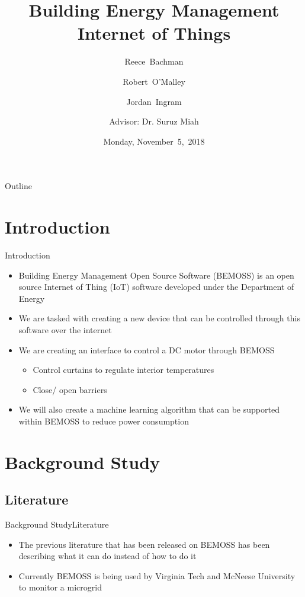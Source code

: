 \documentclass{beamer}
\title[BEMOSS]{Building Energy Management Internet of Things}
\author[R.~Bachman, R.~O'Malley, J.~Ingram]{Reece~Bachman \and Robert~O'Malley \and Jordan~Ingram \and
Advisor: Dr. Suruz Miah}
\date[November~5,~2018]{Monday, November~5,~2018}
\begin{document}
\begin{frame}
  \titlepage
\end{frame}

\begin{frame}{Outline}
  \tableofcontents
\end{frame}

\section{Introduction}

\begin{frame}{Introduction}{}
  \begin{itemize}
        \item Building Energy Management Open Source Software (BEMOSS) is an open source Internet of Thing (IoT) software developed under the Department of Energy 
        \item We are tasked with creating a new device that can be controlled through this software over the internet 
        \item We are creating an interface to control a DC motor through BEMOSS
        \begin{itemize}
            \item Control curtains to regulate interior temperatures
            \item Close/ open barriers
            \end{itemize}
        \item We will also create a machine learning algorithm that can be supported within BEMOSS to reduce power consumption
        \end{itemize}
\end{frame}


\section{Background Study}

\subsection{Literature}

\begin{frame}{Background Study}{Literature}
    \begin{itemize}
        \item The previous literature that has been released on BEMOSS has been describing what it can do instead of how to do it
        \item Currently BEMOSS is being used by Virginia Tech and McNeese University to monitor a microgrid
    \end{itemize}
\end{frame}
\end{document}
